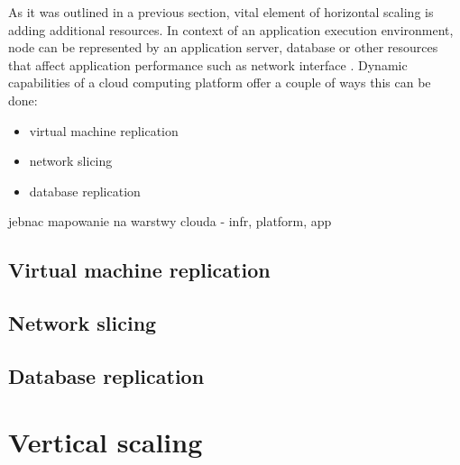 As it was outlined in a previous section, vital element of horizontal scaling is adding additional resources. In context of an application execution environment, node can be represented by an application server, database or other resources that affect application performance such as network interface \cite{VaRoBu11}. Dynamic capabilities of a cloud computing platform offer a couple of ways this can be done:
\begin{itemize}
	\item virtual machine replication
	\item network slicing
	\item database replication
\end{itemize}

jebnac mapowanie na warstwy clouda - infr, platform, app

\subsection{Virtual machine replication}

\subsection{Network slicing}

\subsection{Database replication}


\section{Vertical scaling}
